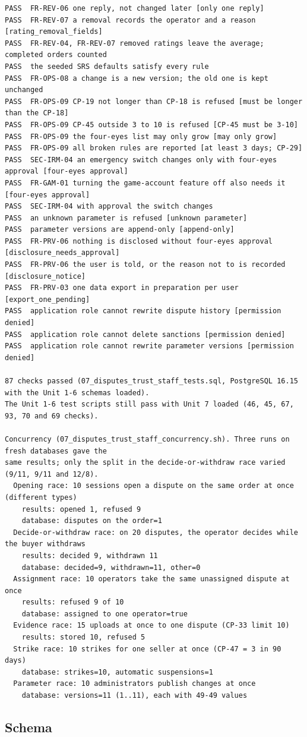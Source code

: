 \documentclass[11pt,a4paper]{article}
\begin{document}
{\begin{verbatim}
PASS  FR-REV-06 one reply, not changed later [only one reply]
PASS  FR-REV-07 a removal records the operator and a reason [rating_removal_fields]
PASS  FR-REV-04, FR-REV-07 removed ratings leave the average; completed orders counted
PASS  the seeded SRS defaults satisfy every rule
PASS  FR-OPS-08 a change is a new version; the old one is kept unchanged
PASS  FR-OPS-09 CP-19 not longer than CP-18 is refused [must be longer than the CP-18]
PASS  FR-OPS-09 CP-45 outside 3 to 10 is refused [CP-45 must be 3-10]
PASS  FR-OPS-09 the four-eyes list may only grow [may only grow]
PASS  FR-OPS-09 all broken rules are reported [at least 3 days; CP-29]
PASS  SEC-IRM-04 an emergency switch changes only with four-eyes approval [four-eyes approval]
PASS  FR-GAM-01 turning the game-account feature off also needs it [four-eyes approval]
PASS  SEC-IRM-04 with approval the switch changes
PASS  an unknown parameter is refused [unknown parameter]
PASS  parameter versions are append-only [append-only]
PASS  FR-PRV-06 nothing is disclosed without four-eyes approval [disclosure_needs_approval]
PASS  FR-PRV-06 the user is told, or the reason not to is recorded [disclosure_notice]
PASS  FR-PRV-03 one data export in preparation per user [export_one_pending]
PASS  application role cannot rewrite dispute history [permission denied]
PASS  application role cannot delete sanctions [permission denied]
PASS  application role cannot rewrite parameter versions [permission denied]

87 checks passed (07_disputes_trust_staff_tests.sql, PostgreSQL 16.15 with the Unit 1-6 schemas loaded).
The Unit 1-6 test scripts still pass with Unit 7 loaded (46, 45, 67, 93, 70 and 69 checks).

Concurrency (07_disputes_trust_staff_concurrency.sh). Three runs on fresh databases gave the
same results; only the split in the decide-or-withdraw race varied (9/11, 9/11 and 12/8).
  Opening race: 10 sessions open a dispute on the same order at once (different types)
    results: opened 1, refused 9
    database: disputes on the order=1
  Decide-or-withdraw race: on 20 disputes, the operator decides while the buyer withdraws
    results: decided 9, withdrawn 11
    database: decided=9, withdrawn=11, other=0
  Assignment race: 10 operators take the same unassigned dispute at once
    results: refused 9 of 10
    database: assigned to one operator=true
  Evidence race: 15 uploads at once to one dispute (CP-33 limit 10)
    results: stored 10, refused 5
  Strike race: 10 strikes for one seller at once (CP-47 = 3 in 90 days)
    database: strikes=10, automatic suspensions=1
  Parameter race: 10 administrators publish changes at once
    database: versions=11 (1..11), each with 49-49 values
\end{verbatim}
}
\subsection{Schema}

\end{document}
